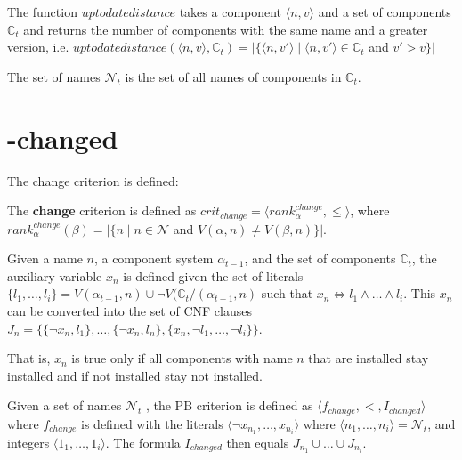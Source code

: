 \begin{defs}
The function $uptodatedistance$ takes a component $\langle n, v \rangle$ and a set of components $\mathbb{C}_t$ and returns the number of components with the same name and a greater version,
i.e. $uptodatedistance(\langle n, v \rangle,\mathbb{C}_t) = |\{\langle n, v' \rangle \mid \langle n, v' \rangle \in \mathbb{C}_t $ and $ v' > v \}|$
\end{defs}

\begin{defs}
The set of names $\mathcal{N}_t$ is the set of all names of components in $\mathbb{C}_t$.
\end{defs}

\section{-changed}

The change criterion is defined:
\begin{defs}
	The \textbf{change} criterion is defined as $crit_{change} = \langle rank^{change}_{\alpha}, \leq \rangle$,
	where $rank^{change}_{\alpha}(\beta) = |\{n \mid n \in \mathcal{N}$ and $V(\alpha,n) \neq V(\beta,n) \}|$.
\end{defs}

\begin{defs}
Given a name $n$, a component system $\alpha_{t-1}$, and the set of components $\mathbb{C}_t$,
the auxiliary variable $x_n$ is defined given the set of literals $\{l_1,\ldots,l_i\} = V(\alpha_{t-1},n) \cup \neg V(\mathbb{C}_t / (\alpha_{t-1} ,n)$ 
such that $x_n \Leftrightarrow l_1 \wedge \ldots \wedge l_i$.
This $x_n$ can be converted into the set of CNF clauses $J_n = \{ \{\neg x_n,l_1\},\ldots, \{\neg x_n,l_n\}, \{x_n, \neg l_1,\ldots,\neg l_i\}\}$.
\end{defs}
That is, $x_n$ is true only if all components with name $n$ that are installed stay installed and if not installed stay not installed.

\begin{defs}
Given a set of names $\mathcal{N}_t$ , the PB criterion is defined as $\langle f_{change}, <, I_{changed} \rangle$ where 
$f_{change}$ is defined with the literals $\langle \neg x_{n_1},\ldots, x_{n_i}\rangle$ where $\langle n_1,\ldots, n_i \rangle = \mathcal{N}_t$, and integers $\langle 1_1,\ldots,1_i\rangle$.
The formula $I_{changed}$ then equals $J_{n_1} \cup \ldots \cup J_{n_i}$.
\end{defs}


